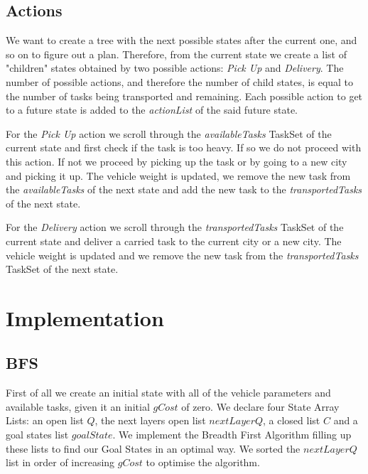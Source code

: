 \documentclass[11pt]{article}
\begin{document}
\subsection{Actions}
\indent \indent We want to create a tree with the next possible states after the current one, and so on to figure out a plan. Therefore, from the current state we create a list of "children" states obtained by two possible actions: \textit{Pick Up} and \textit{Delivery}. The number of possible actions, and therefore the number of child states, is equal to the number of tasks being transported and remaining. Each possible action to get to a future state is added to the \textit{actionList} of the said future state.

For the \textit{Pick Up} action we scroll through the \textit{availableTasks} TaskSet of the current state and first check if the task is too heavy. If so we do not proceed with this action. If not we proceed by picking up the task or by going to a new city and picking it up. The vehicle weight is updated, we remove the new task from the \textit{availableTasks} of the next state and add the new task to the \textit{transportedTasks} of the next state.

For the \textit{Delivery} action we scroll through the \textit{transportedTasks} TaskSet of the current state and deliver a carried task to the current city or a new city. The vehicle weight is updated and we remove the new task from the \textit{transportedTasks} TaskSet of the next state.


\section{Implementation}

\subsection{BFS}
\indent \indent First of all we create an initial state with all of the vehicle parameters and available tasks, given it an initial $gCost$ of zero. We declare four State Array Lists: an open list $Q$, the next layers open list $nextLayerQ$, a closed list $C$ and a goal states list $goalState$. We implement the Breadth First Algorithm filling up these lists to find our Goal States in an optimal way. We sorted the $nextLayerQ$ list in order of increasing $gCost$ to optimise the algorithm.
\end{document}
